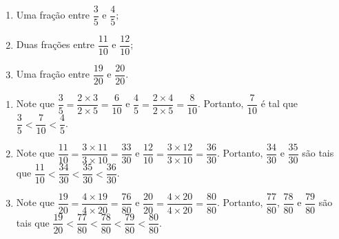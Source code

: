 \documentclass[10 pt,usenames,dvipsnames, oneside]{article}
\begin{document}
\begin{enumerate}
\item  Uma fração entre $\dfrac{3}{5}$ e $\dfrac{4}{5}$;

\item  Duas frações entre $\dfrac{11}{10}$ e $\dfrac{12}{10}$;

\item  Uma fração entre $\dfrac{19}{20}$ e $\dfrac{20}{20}$.
\end{enumerate}

\ifdefined\prof
\begin{solucao}

\begin{enumerate}
    \item       Note que       $\dfrac{3}{5} = \dfrac{2 \times 3}{2 \times 5} =
\dfrac{6}{10}$       e       $\dfrac{4}{5} = \dfrac{2 \times 4}{2 \times 5} =
\dfrac{8}{10}$. Portanto,       $\dfrac{7}{10}$       é tal que       $\dfrac{3}{5}
< \dfrac{7}{10} < \dfrac{4}{5}$.
    \item       Note que       $\dfrac{11}{10} = \dfrac{3 \times 11}{3 \times 10}
= \dfrac{33}{30}$       e       $\dfrac{12}{10} = \dfrac{3 \times 12}{3 \times 10}
= \dfrac{36}{30}$. Portanto,       $\dfrac{34}{30}$       e       $\dfrac{35}{30}$
     são tais que       $\dfrac{11}{10} < \dfrac{34}{30} < \dfrac{35}{30} <
\dfrac{36}{30}$.
    \item       Note que       $\dfrac{19}{20} = \dfrac{4 \times 19}{4 \times 20}
= \dfrac{76}{80}$       e       $\dfrac{20}{20} = \dfrac{4 \times 20}{4 \times 20}
= \dfrac{80}{80}$. Portanto,       $\dfrac{77}{80}$,       $\dfrac{78}{80}$       e
      $\dfrac{79}{80}$       são tais que       $\dfrac{19}{20} < \dfrac{77}{80} <
\dfrac{78}{80} < \dfrac{79}{80} < \dfrac{80}{80}$.
\end{enumerate}

\end{solucao}
\fi
\end{document}
